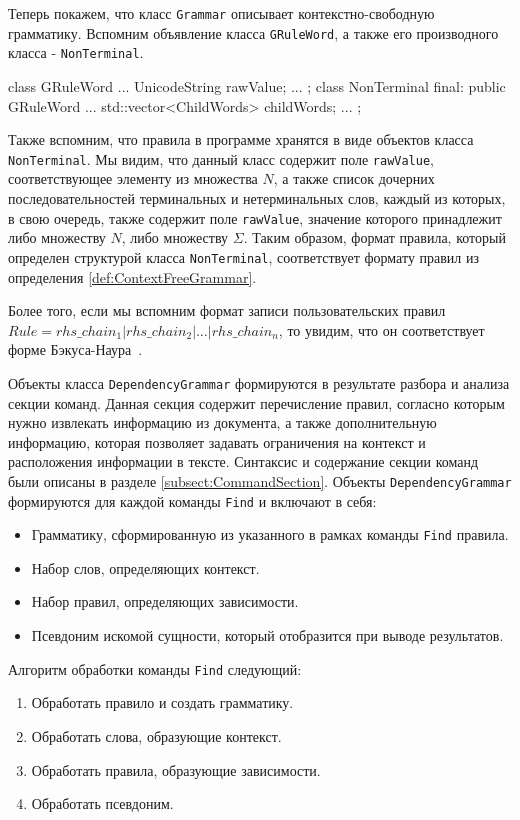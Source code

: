 Теперь покажем, что класс \lstinline{Grammar} описывает контекстно-свободную грамматику. Вспомним объявление класса \lstinline{GRuleWord}, а также его производного класса - \lstinline{NonTerminal}.
\begin{Verb}
class GRuleWord {
    ...
    UnicodeString rawValue;
    ...
};
class NonTerminal final: public GRuleWord {
    ...
    std::vector<ChildWords> childWords;
    ...
};
\end{Verb}
Также вспомним, что правила в программе хранятся в виде объектов класса \lstinline{NonTerminal}. Мы видим, что данный класс содержит поле \lstinline{rawValue}, соответствующее элементу из множества $N$, а также список дочерних последовательностей терминальных и нетерминальных слов, каждый из которых, в свою очередь, также содержит поле \lstinline{rawValue}, значение которого принадлежит либо множеству $N$, либо множеству $\Sigma$. Таким образом, формат правила, который определен структурой класса \lstinline{NonTerminal}, соответствует формату правил из определения \ref{def:ContextFreeGrammar}. 

Более того, если мы вспомним формат записи пользовательских правил $Rule = rhs\_chain_1 | rhs\_chain_2 | \dots | rhs\_chain_n$, то увидим, что он соответствует форме Бэкуса-Наура~\autocite{backus-naur}.

Объекты класса \lstinline{DependencyGrammar} формируются в результате разбора и анализа секции команд. Данная секция содержит перечисление правил, согласно которым нужно извлекать информацию из документа, а также дополнительную информацию, которая позволяет задавать ограничения на контекст и расположения информации в тексте. Синтаксис и содержание секции команд были описаны в разделе \ref{subsect:CommandSection}. Объекты \lstinline{DependencyGrammar} формируются для каждой команды \lstinline{Find} и включают в себя:
\begin{itemize}
  \item Грамматику, сформированную из указанного в рамках команды \lstinline{Find} правила.
  \item Набор слов, определяющих контекст.
  \item Набор правил, определяющих зависимости.
  \item Псевдоним искомой сущности, который отобразится при выводе результатов.
\end{itemize}

Алгоритм обработки команды \lstinline{Find} следующий:
\begin{enumerate}
  \item Обработать правило и создать грамматику.
  \item Обработать слова, образующие контекст.
  \item Обработать правила, образующие зависимости.
  \item Обработать псевдоним.
\end{enumerate}

